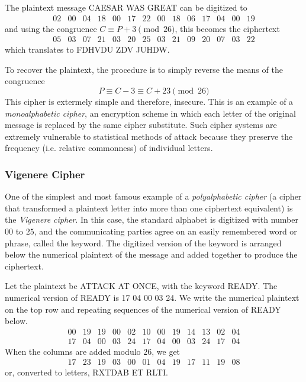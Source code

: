 \documentclass{article}
\newcounter{example}[section]
\begin{document}
The plaintext message CAESAR WAS GREAT can be digitized to 
\begin{equation}
  \begin{array}{cccccccccccccc}
       02&00&04&18&00&17&22&00&18&06&17&04&00&19
  \end{array}
\end{equation}
and using the congruence $C \equiv P + 3 \pmod{26}$, this becomes the ciphertext
\begin{equation}
  \begin{array}{cccccccccccccc}
       05&03&07&21&03&20&25&03&21&09&20&07&03&22
  \end{array}
\end{equation}
which translates to FDHVDU ZDV JUHDW. 

To recover the plaintext, the procedure is to simply reverse the means of the congruence
\begin{equation}
  P \equiv C - 3 \equiv C + 23 \pmod{26}
\end{equation}
This cipher is extermely simple and therefore, insecure. This is an example of a \textit{monoalphabetic cipher}, an encryption scheme in which each letter of the original message is replaced by the same cipher substitute. Such cipher systems are extremely vulnerable to statistical methods of attack because they preserve the frequency (i.e. relative commonness) of individual letters. 


\subsubsection{Vigenere Cipher}
One of the simplest and most famous example of a \textit{polyalphabetic cipher} (a cipher that transformed a plaintext letter into more than one ciphertext equivalent) is the \textit{Vigenere cipher}. In this case, the standard alphabet is digitized with number $00$ to $25$, and the communicating parties agree on an easily remembered word or phrase, called the keyword. The digitized version of the keyword is arranged below the numerical plaintext of the message and added together to produce the ciphertext. 

Let the plaintext be ATTACK AT ONCE, with the keyword READY. The numerical version of READY is 17 04 00 03 24. We write the numerical plaintext on the top row and repeating sequences of the numerical version of READY below. 
\begin{equation}
  \begin{array}{cccccccccccc}
      00&19&19&00&02&10&00&19&14&13&02&04 \\
      17&04&00&03&24&17&04&00&03&24&17&04
  \end{array}
\end{equation}
When the columns are added modulo $26$, we get
\begin{equation}
  \begin{array}{cccccccccccc}
      17&23&19&03&00&01&04&19&17&11&19&08
  \end{array}
\end{equation}
or, converted to letters, RXTDAB ET RLTI. 
\end{document}
